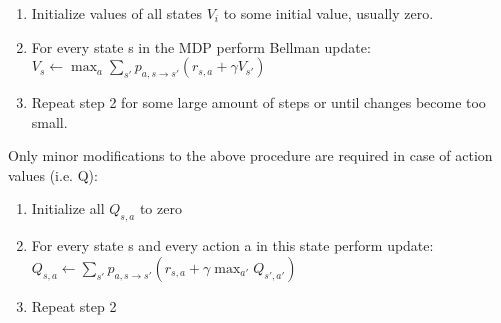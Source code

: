 \begin{enumerate}
  \item Initialize values of all states \begin{math}V_i\end{math} to some
    initial value, usually zero.
  \item For every state s in the MDP perform Bellman update: \begin{math}V_s \leftarrow
    \max_a \sum_{s'}p_{a,s \rightarrow s'}(r_{s,a} + \gamma V_{s'})\end{math}
  \item Repeat step 2 for some large amount of steps or until changes become too small.
\end{enumerate}

Only minor modifications to the above procedure are required in case of action values (i.e. Q):


\begin{enumerate}
  \item Initialize all \begin{math}Q_{s,a}\end{math} to zero
  \item For every state s and every action a in this state perform
    update: \begin{math}Q_{s,a} \leftarrow \sum_{s'}p_{a,s \rightarrow
        s'}(r_{s,a} + \gamma \max_{a'}Q_{s',a'})\end{math}
  \item Repeat step 2
\end{enumerate}


